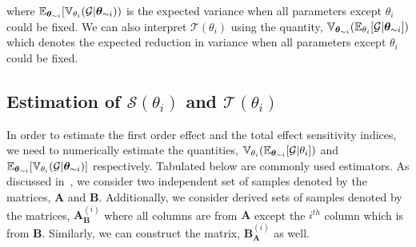 \noindent where $\operatorname{\mathbb{E}}_{\bm \theta_{\sim i}}[\operatorname{\mathbb{V}}_{\theta_{i}}(\mathcal{G}\vert\bm{\theta}_{\sim i}))$ is the expected variance when all parameters
except $\theta_{i}$ could be fixed. We can also interpret $\mathcal{T}(\theta_{i})$ using the quantity,
$\operatorname{\mathbb{V}}_{\bm \theta_{\sim i}}(\operatorname{\mathbb{E}}_{\theta_{i}}[\mathcal{G}\vert\bm\theta_{\sim i}])$ which denotes the expected reduction in variance
when all parameters except $\theta_{i}$ could be fixed.

\subsection{Estimation of $\mathcal{S}(\theta_{i})$ and $\mathcal{T}(\theta_{i})$}

In order to estimate the first order effect and the total effect sensitivity indices, we need to numerically estimate
the quantities, $\operatorname{\mathbb{V}}_{\theta_{i}}(\operatorname{\mathbb{E}}_{\bm \theta_{\sim i}}[\mathcal{G}\vert\theta_{i}])$ and
$\operatorname{\mathbb{E}}_{\bm \theta_{\sim i}}[\operatorname{\mathbb{V}}_{\theta_{i}}(\mathcal{G}\vert\bm{\theta}_{\sim i})]$ respectively. Tabulated below are commonly used estimators. As discussed in~\cite{Saltelli:2010}, we consider two independent set of samples denoted by the matrices,
$\bm A$ and $\bm B$. Additionally, we consider derived sets of samples denoted by the  matrices,
$\bm A_{\bm B}^{(i)}$ where all columns
are from $\bm A$ except the $i^{th}$ column which is from $\bm B$. Similarly, we can construct the matrix,
$\bm B_{\bm A}^{(i)}$ as well.


